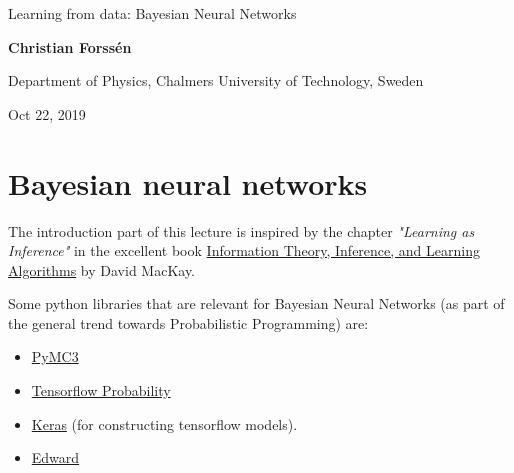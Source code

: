 \documentclass[%
oneside,                 %
final,                   %
10pt]{article}
\begin{document}

\newcommand{\exercisesection}[1]{\subsection*{#1}}







\thispagestyle{empty}

\begin{center}
{\LARGE\bf
\begin{spacing}{1.25}
Learning from data: Bayesian Neural Networks
\end{spacing}
}
\end{center}


\begin{center}
{\bf Christian Forssén}
\end{center}

    \begin{center}
\centerline{{\small Department of Physics, Chalmers University of Technology, Sweden}}
\end{center}
    

\begin{center}
Oct 22, 2019
\end{center}

\vspace{1cm}


\section{Bayesian neural networks}
The introduction part of this lecture is inspired by the chapter \emph{"Learning as Inference"} in the excellent book \href{{http://www.inference.org.uk/mackay/itila/}}{Information Theory, Inference, and Learning Algorithms} by David MacKay.

Some python libraries that are relevant for Bayesian Neural Networks (as part of the general trend towards Probabilistic Programming) are:
\begin{itemize}
\item \href{{https://docs.pymc.io/}}{PyMC3}

\item \href{{https://www.tensorflow.org/probability}}{Tensorflow Probability}

\item \href{{https://keras.io/}}{Keras} (for constructing tensorflow models).

\item \href{{http://edwardlib.org/}}{Edward}
\end{itemize}
\end{document}
